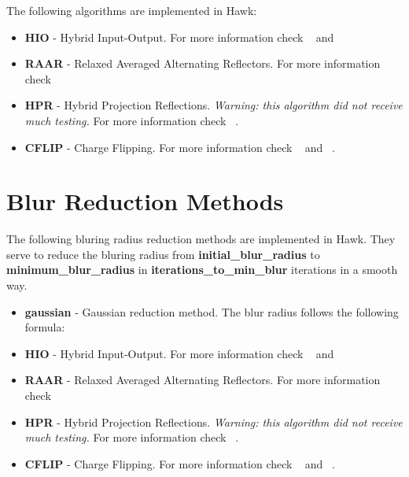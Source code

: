 \documentclass{report}
\begin{document}
The following algorithms are implemented in Hawk:

\begin{itemize}
\item \textbf{HIO} - Hybrid Input-Output. For more information check ~\cite{Fienup1978} and ~\cite{Fienup1982}


\item \textbf{RAAR} - Relaxed Averaged Alternating Reflectors. For more information check ~\cite{Luke2005}


\item \textbf{HPR} - Hybrid Projection Reflections. {\em Warning: this algorithm did not receive much testing.} For more information check ~\cite{Luke2003}. 


\item \textbf{CFLIP} - Charge Flipping. For more information check ~\cite{Oszlanyi2004} and ~\cite{Oszlanyi2005}. 


\end{itemize}


\section{Blur Reduction Methods}
\label{blur reduction methods}

The following bluring radius reduction methods are implemented in Hawk. They serve to reduce the bluring radius
from \textbf{initial\_blur\_radius} to \textbf{minimum\_blur\_radius} in \textbf{iterations\_to\_min\_blur} iterations
in a smooth way.

\begin{itemize}

\item \textbf{gaussian} - Gaussian reduction method. The blur radius follows the following formula:



\end{itemize}
\begin{itemize}
\item \textbf{HIO} - Hybrid Input-Output. For more information check ~\cite{Fienup1978} and ~\cite{Fienup1982}


\item \textbf{RAAR} - Relaxed Averaged Alternating Reflectors. For more information check ~\cite{Luke2005}


\item \textbf{HPR} - Hybrid Projection Reflections. {\em Warning: this algorithm did not receive much testing.} For more information check ~\cite{Luke2003}. 


\item \textbf{CFLIP} - Charge Flipping. For more information check ~\cite{Oszlanyi2004} and ~\cite{Oszlanyi2005}. 


\end{itemize}
\end{document}
